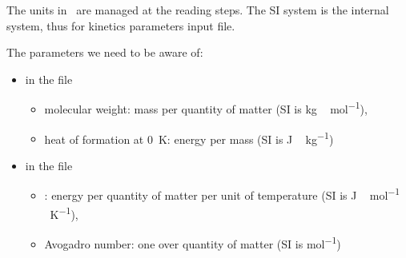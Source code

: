 The units in \Antioch\ are managed at the reading
steps. The SI system is the internal system, thus
for kinetics parameters input file.

The parameters we need to be aware of:
\begin{itemize}
\item in the file 
        \begin{itemize}
        \item molecular weight: mass per quantity of matter (SI is \unit{kg\,mol^{-1}}),
        \item heat of formation at 0~\unit{K}: energy per mass (SI is \unit{J\,kg^{-1}})
        \end{itemize}
\item in the file 
        \begin{itemize}
        \item \Rg: energy per quantity of matter per unit of temperature (SI is \unit{J\,mol^{-1}\,K^{-1}}),
        \item Avogadro number: one over quantity of matter (SI is \unit{mol^{-1}})
        \end{itemize}
\end{itemize}

